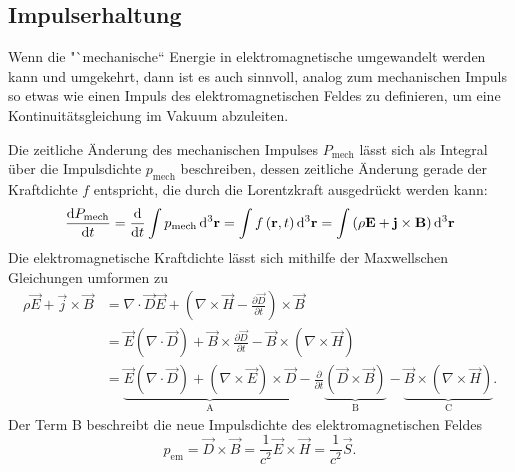\subsection{Impulserhaltung}

Wenn die "`mechanische`` Energie in elektromagnetische umgewandelt werden kann und umgekehrt, dann ist es auch sinnvoll, analog zum mechanischen Impuls so etwas wie einen Impuls des elektromagnetischen Feldes zu definieren, um eine Kontinuitätsgleichung im Vakuum abzuleiten.

Die zeitliche Änderung des mechanischen Impulses $P_{\text{mech}}$ lässt sich als Integral über die Impulsdichte $p_{\text{mech}}$ beschreiben, dessen zeitliche Änderung gerade der Kraftdichte $f$ entspricht, die durch die Lorentzkraft ausgedrückt werden kann:
\begin{equation*}
	\frac{\diff P_{\text{mech}}}{\diff t}=\frac{\diff }{\diff t}\int p_{\text{mech}}\diffa[3]{\vec{r}}=\int f\left(\vec {r},t\right)\diffa[3]{\vec{r}}=\int \left(\rho \vec {E}+\vec {j}\times \vec {B}\right)\diffa[3]{\vec{r}}
\end{equation*}
Die elektromagnetische Kraftdichte lässt sich mithilfe der Maxwellschen Gleichungen umformen zu
\begin{align*}
	\rho \vec {E}+\vec {j}\times \vec {B} & =\nabla \cdot \vec {D}\vec {E}+\left(\nabla \times \vec {H}-\frac{\partial \vec {D}}{\partial t}\right)\times \vec {B}                                                                                                                                                                                                          \\
	                                      & =\vec {E}\left(\nabla \cdot \vec {D}\right)+\vec {B}\times \frac{\partial \vec {D}}{\partial t}-\vec {B}\times \left(\nabla \times \vec {H}\right)                                                                                                                                                                              \\
	                                      & =\underset{\mathrm{A}}{\underbrace{\vec {E}\left(\nabla \cdot \vec {D}\right)+\left(\nabla \times \vec {E}\right)\times \vec {D}}}-\frac{\partial }{\partial t}\underset{\mathrm{B}}{\underbrace{\left(\vec {D}\times \vec {B}\right)}}-\underset{\mathrm{C}}{\underbrace{\vec {B}\times \left(\nabla \times \vec {H}\right)}}.
\end{align*}
Der Term B beschreibt die neue Impulsdichte des elektromagnetischen Feldes
\begin{equation*}
	p_{\mathrm{em}}=\vec {D}\times \vec {B}=\frac{1}{c^{2}}\vec {E}\times \vec {H}=\frac{1}{c^{2}}\vec {S}.
\end{equation*}
